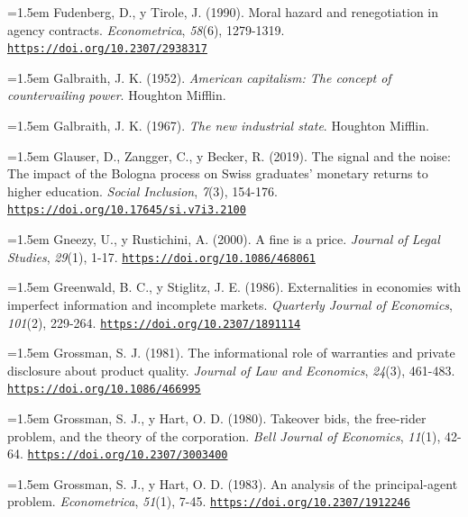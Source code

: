 \documentclass[10pt,a4paper]{article}
\begin{document}
\noindent\hangindent=1.5em Fudenberg, D., y Tirole, J. (1990). Moral hazard and renegotiation in agency contracts. \textit{Econometrica}, \textit{58}(6), 1279-1319. \href{https://doi.org/10.2307/2938317}{\nolinkurl{https://doi.org/10.2307/2938317}}

\noindent\hangindent=1.5em Galbraith, J. K. (1952). \textit{American capitalism: The concept of countervailing power}. Houghton Mifflin.

\noindent\hangindent=1.5em Galbraith, J. K. (1967). \textit{The new industrial state}. Houghton Mifflin.

\noindent\hangindent=1.5em Glauser, D., Zangger, C., y Becker, R. (2019). The signal and the noise: The impact of the Bologna process on Swiss graduates' monetary returns to higher education. \textit{Social Inclusion}, \textit{7}(3), 154-176. \href{https://doi.org/10.17645/si.v7i3.2100}{\nolinkurl{https://doi.org/10.17645/si.v7i3.2100}}

\noindent\hangindent=1.5em Gneezy, U., y Rustichini, A. (2000). A fine is a price. \textit{Journal of Legal Studies}, \textit{29}(1), 1-17. \href{https://doi.org/10.1086/468061}{\nolinkurl{https://doi.org/10.1086/468061}}

\noindent\hangindent=1.5em Greenwald, B. C., y Stiglitz, J. E. (1986). Externalities in economies with imperfect information and incomplete markets. \textit{Quarterly Journal of Economics}, \textit{101}(2), 229-264. \href{https://doi.org/10.2307/1891114}{\nolinkurl{https://doi.org/10.2307/1891114}}

\noindent\hangindent=1.5em Grossman, S. J. (1981). The informational role of warranties and private disclosure about product quality. \textit{Journal of Law and Economics}, \textit{24}(3), 461-483. \href{https://doi.org/10.1086/466995}{\nolinkurl{https://doi.org/10.1086/466995}}

\noindent\hangindent=1.5em Grossman, S. J., y Hart, O. D. (1980). Takeover bids, the free-rider problem, and the theory of the corporation. \textit{Bell Journal of Economics}, \textit{11}(1), 42-64. \href{https://doi.org/10.2307/3003400}{\nolinkurl{https://doi.org/10.2307/3003400}}

\noindent\hangindent=1.5em Grossman, S. J., y Hart, O. D. (1983). An analysis of the principal-agent problem. \textit{Econometrica}, \textit{51}(1), 7-45. \href{https://doi.org/10.2307/1912246}{\nolinkurl{https://doi.org/10.2307/1912246}}
\end{document}
